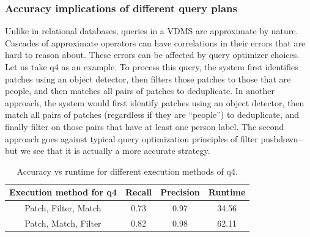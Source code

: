 \subsubsection{Accuracy implications of different query plans}
Unlike in relational databases, queries in a VDMS are approximate by nature.
Cascades of approximate operators can have correlations in their errors that are hard to reason about.
These errors can be affected by query optimizer choices.
Let us take q4 as an example.
To process this query, the system first identifies patches using an object detector, then filters those patches to those that are people, and then matches all pairs of patches to deduplicate.
In another approach, the system would first identify patches using an object detector, then match all pairs of patches (regardless if they are ``people'') to deduplicate, and finally filter on those pairs that have at least one person label.
The second approach goes against typical query optimization principles of filter pushdown--but we see that it is actually a more accurate strategy.

\begin{table}[]
\centering
\begin{tabular}{|c|c|c|c|}
\hline
Execution method for q4 & Recall               & Precision & Runtime         \\
\hline
Patch, Filter, Match & 0.73      & 0.97    & 34.56  \\
Patch, Match, Filter & 0.82      & 0.98    & 62.11  \\
\hline
\end{tabular}
\caption{Accuracy vs runtime for different execution methods of q4.} \label{tab:q4execution}
\end{table}



